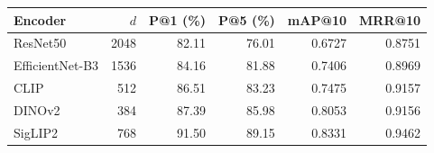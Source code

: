 \begin{tabular}{@{}lrrrrr@{}}
\toprule
\textbf{Encoder} & \textbf{$d$} & \textbf{P@1 (\%)} & \textbf{P@5 (\%)} & \textbf{mAP@10} & \textbf{MRR@10} \\ \midrule
ResNet50 & 2048 & 82.11 & 76.01 & 0.6727 & 0.8751 \\
EfficientNet-B3 & 1536 & 84.16 & 81.88 & 0.7406 & 0.8969 \\
CLIP & 512 & 86.51 & 83.23 & 0.7475 & 0.9157 \\
DINOv2 & 384 & 87.39 & 85.98 & 0.8053 & 0.9156 \\
SigLIP2 & 768 & 91.50 & 89.15 & 0.8331 & 0.9462 \\
\bottomrule
\end{tabular}

